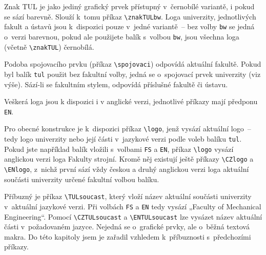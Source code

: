 \documentclass[a4paper,12pt,twoside]{article}
\newcommand{\cmdfont}[1]{\texttt{\color{\tulcolor}#1}}
\newcommand{\cmd}[1]{\cmdfont{\textbackslash #1}}
\begin{document}










Znak TUL je jako jediný grafický prvek přístupný v~černobílé variantě, i pokud se
sází barevně. Slouží k~tomu příkaz \cmd{znakTULbw}. Loga univerzity,
jednotlivých fakult a ústavů jsou k~dispozici pouze v~jedné variantě~-- bez
volby \cmdfont{bw} se jedná o~verzi barevnou, pokud ale použijete balík
s~volbou \cmdfont{bw}, jsou všechna loga (včetně \cmd{znakTUL}) černobílá.

Podoba spojovacího prvku (příkaz \cmd{spojovaci}) odpovídá aktuální fakultě.
Pokud byl balík \cmdfont{tul} použit bez fakultní volby, jedná se o~spojovací
prvek univerzity (viz výše). Sází-li se fakultním stylem, odpovídá příslušné
fakultě či ústavu.

Veškerá loga jsou k dispozici i v anglické verzi, jednotlivé příkazy mají
předponu \cmdfont{EN}.











Pro obecné konstrukce je k~dispozici příkaz \cmd{logo}, jenž vysází aktuální
logo~-- tedy logo univerzity nebo její části v~jazykové verzi podle voleb
balíku \cmdfont{tul}. Pokud jste například balík vložili s~volbami \cmdfont{FS}
a \cmdfont{EN}, příkaz \cmd{logo} vysází anglickou verzi loga Fakulty strojní.
Kromě něj existují ještě příkazy \cmd{CZlogo} a \cmd{ENlogo}, z~nichž první
sází vždy českou a druhý anglickou verzi loga aktuální součásti univerzity
určené fakultní volbou balíku.

Příbuzný je příkaz \cmd{TULsoucast}, který vloží název aktuální součásti
univerzity v~aktuální jazykové verzi. Při volbách \cmdfont{FS} a \cmdfont{EN}
tedy vysází „Faculty of Mechanical Engineering“. Pomocí \cmd{CZTULsoucast} a
\cmd{ENTULsoucast} lze vysázet název aktuální části v~požadovaném jazyce.
Nejedná se o~grafické prvky, ale o~běžná textová makra. Do této kapitoly jsem
je zařadil vzhledem k~příbuznosti s~předchozími příkazy.
\end{document}
